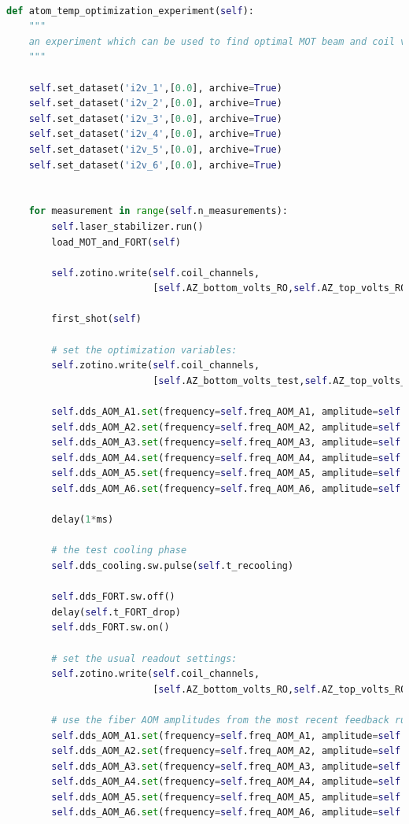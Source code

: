 \lstset{style=mystyle}

\begin{lstlisting}[language=Python
]

def atom_temp_optimization_experiment(self):
    """
    an experiment which can be used to find optimal MOT beam and coil values using an atom in the FORT
    """

    self.set_dataset('i2v_1',[0.0], archive=True)
    self.set_dataset('i2v_2',[0.0], archive=True)
    self.set_dataset('i2v_3',[0.0], archive=True)
    self.set_dataset('i2v_4',[0.0], archive=True)
    self.set_dataset('i2v_5',[0.0], archive=True)
    self.set_dataset('i2v_6',[0.0], archive=True)


    for measurement in range(self.n_measurements):
        self.laser_stabilizer.run()
        load_MOT_and_FORT(self)

        self.zotino.write(self.coil_channels, 
                          [self.AZ_bottom_volts_RO,self.AZ_top_volts_RO,self.AX_volts_RO,self.AY_volts_RO])

        first_shot(self)

        # set the optimization variables:
        self.zotino.write(self.coil_channels, 
                          [self.AZ_bottom_volts_test,self.AZ_top_volts_test,self.AX_volts_test,self.AY_volts_test])

        self.dds_AOM_A1.set(frequency=self.freq_AOM_A1, amplitude=self.test_amplitude1)
        self.dds_AOM_A2.set(frequency=self.freq_AOM_A2, amplitude=self.test_amplitude2)
        self.dds_AOM_A3.set(frequency=self.freq_AOM_A3, amplitude=self.test_amplitude3)
        self.dds_AOM_A4.set(frequency=self.freq_AOM_A4, amplitude=self.test_amplitude4)
        self.dds_AOM_A5.set(frequency=self.freq_AOM_A5, amplitude=self.test_amplitude5)
        self.dds_AOM_A6.set(frequency=self.freq_AOM_A6, amplitude=self.test_amplitude6)

        delay(1*ms)

        # the test cooling phase
        self.dds_cooling.sw.pulse(self.t_recooling)

        self.dds_FORT.sw.off()
        delay(self.t_FORT_drop)
        self.dds_FORT.sw.on()

        # set the usual readout settings:
        self.zotino.write(self.coil_channels, 
                          [self.AZ_bottom_volts_RO,self.AZ_top_volts_RO,self.AX_volts_RO,self.AY_volts_RO])

        # use the fiber AOM amplitudes from the most recent feedback run
        self.dds_AOM_A1.set(frequency=self.freq_AOM_A1, amplitude=self.stabilizer_AOM_A1.amplitude) 
        self.dds_AOM_A2.set(frequency=self.freq_AOM_A2, amplitude=self.stabilizer_AOM_A2.amplitude)
        self.dds_AOM_A3.set(frequency=self.freq_AOM_A3, amplitude=self.stabilizer_AOM_A3.amplitude)
        self.dds_AOM_A4.set(frequency=self.freq_AOM_A4, amplitude=self.stabilizer_AOM_A4.amplitude)
        self.dds_AOM_A5.set(frequency=self.freq_AOM_A5, amplitude=self.stabilizer_AOM_A5.amplitude)
        self.dds_AOM_A6.set(frequency=self.freq_AOM_A6, amplitude=self.stabilizer_AOM_A6.amplitude)


\end{lstlisting}
